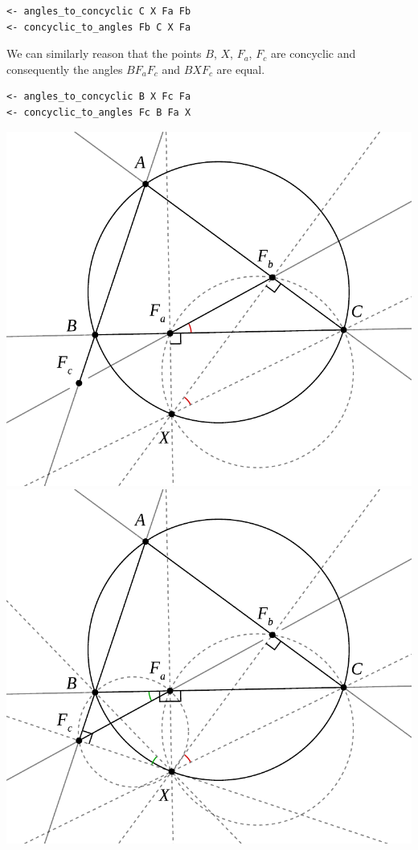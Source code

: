 \documentclass[runningheads]{llncs}
\begin{document}
\begin{verbatim}
<- angles_to_concyclic C X Fa Fb
<- concyclic_to_angles Fb C X Fa
\end{verbatim}

We can similarly reason that the points $B$, $X$, $F_a$, $F_c$ are
concyclic and consequently the angles $BF_aF_c$ and $BXF_c$ are
equal.

\begin{verbatim}
<- angles_to_concyclic B X Fc Fa
<- concyclic_to_angles Fc B Fa X
\end{verbatim}

\centerline{%
  \includegraphics[width = \imgwidth]{simson3.pdf}%
  \includegraphics[width = \imgwidth]{simson4.pdf}%
}
\bigskip
\end{document}

